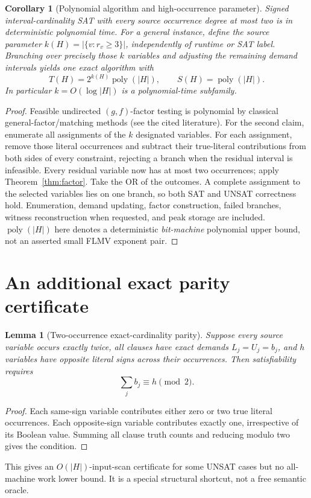 \documentclass[11pt]{article}
\newtheorem{lemma}[theorem]{Lemma}
\newtheorem{corollary}[theorem]{Corollary}
\begin{document}
\begin{corollary}[Polynomial algorithm and high-occurrence parameter]
\label{cor:param}
Signed interval-cardinality SAT with every source occurrence degree at most
two is in deterministic polynomial time. For a general instance, define
the \emph{source} parameter
\(k(H)=|\{v:r_v\ge3\}|\), independently of runtime or SAT label.
Branching over precisely those \(k\) variables and adjusting the
remaining demand intervals yields one exact algorithm with
\[
 \boxed{T(H)=2^{k(H)}\operatorname{poly}(|H|),\qquad
 S(H)=\operatorname{poly}(|H|).}
\]
In particular \(k=O(\log|H|)\) is a polynomial-time subfamily.
\end{corollary}
\begin{proof}
Feasible undirected \((g,f)\)-factor testing is polynomial by classical
general-factor/matching methods (see the cited literature).
For the second claim, enumerate all assignments of the \(k\) designated
variables. For each assignment, remove those literal occurrences and
subtract their true-literal contributions from both sides of every
constraint, rejecting a branch when the residual interval is infeasible.
Every residual variable now has at most two occurrences; apply
Theorem~\ref{thm:factor}. Take the OR of the outcomes.
A complete assignment to the selected variables lies on one branch,
so both SAT and UNSAT correctness hold. Enumeration, demand updating,
factor construction, failed branches, witness reconstruction when requested,
and peak storage are included. \(\operatorname{poly}(|H|)\) here denotes a
deterministic \emph{bit-machine} polynomial upper bound, not an asserted
small FLMV exponent pair.
\end{proof}

\section{An additional exact parity certificate}
\begin{lemma}[Two-occurrence exact-cardinality parity]
\label{lem:parity}
Suppose every source variable occurs \emph{exactly twice}, all clauses
have exact demands \(L_j=U_j=b_j\), and \(h\) variables have opposite
literal signs across their occurrences. Then satisfiability requires
\[
 \boxed{\sum_j b_j\equiv h\pmod2.}
\]
\end{lemma}
\begin{proof}
Each same-sign variable contributes either zero or two true
literal occurrences. Each opposite-sign variable contributes exactly
one, irrespective of its Boolean value. Summing all clause truth counts
and reducing modulo two gives the condition.
\end{proof}
This gives an \(O(|H|)\)-input-scan certificate for some UNSAT cases but
no all-machine work lower bound. It is a special structural shortcut,
not a free semantic oracle.
\end{document}
